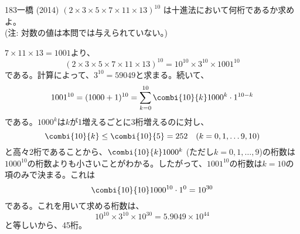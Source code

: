 \begin{thm}{183}{}{一橋 (2014)}
 $(2\times3\times5\times7\times11\times13)^{10}$ は十進法において何桁であるか求めよ。 \\
 (注: 対数の値は本問では与えられていない。)
\end{thm}

$7\times11\times13=1001$より、
\[ (2\times3\times5\times7\times11\times13)^{10}=10^{10}\times3^{10}\times1001^{10} \]
である。計算によって、$3^{10}=59049$と求まる。続いて、
\begin{align*}
 1001^{10}=(1000+1)^{10}=\sum_{k=0}^{10} \combi{10}{k}1000^k\cdot1^{10-k}
\end{align*}
である。$1000^k$は$k$が1増えるごとに3桁増えるのに対し、
\[ \combi{10}{k}\le \combi{10}{5}=252 \quad(k=0,1,\dots 9,10) \]
と高々2桁であることから、$\combi{10}{k}1000^k$ (ただし$k=0,1,\dots, 9$)の桁数は$1000^{10}$の桁数よりも小さいことがわかる。したがって、$1001^{10}$の桁数は$k=10$の項のみで決まる。これは
\[ \combi{10}{10}1000^{10}\cdot1^0=10^{30} \]
である。これを用いて求める桁数は、
\[ 10^{10}\times3^{10}\times10^{30}=5.9049\times10^{44} \]
と等しいから、45桁。